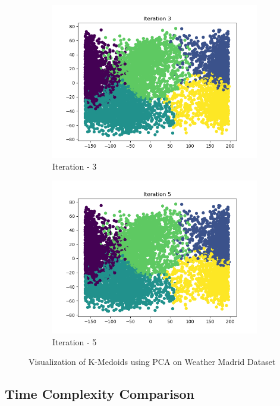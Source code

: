 \documentclass[12pt]{article}
\begin{document}
\begin{figure}[H]
\begin{subfigure}{0.45\linewidth}
		\includegraphics[scale=0.45]{kmd/3.png}
		\caption{Iteration - 3}
	\end{subfigure}%
	\begin{subfigure}{0.45\linewidth}
		\includegraphics[scale=0.45]{kmd/5.png}
		\caption{Iteration - 5}
	\end{subfigure}%
	\caption{Visualization of K-Medoids using PCA on Weather Madrid Dataset}
\end{figure}

\subsection{Time Complexity Comparison}
\end{document}
